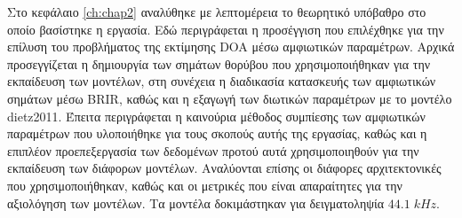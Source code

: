 
\noindent
Στο κεφάλαιο \ref{ch:chap2} αναλύθηκε με λεπτομέρεια το θεωρητικό υπόβαθρο στο οποίο βασίστηκε η εργασία. Εδώ περιγράφεται η προσέγγιση που επιλέχθηκε για την επίλυση του προβλήματος της εκτίμησης DOA μέσω αμφιωτικών παραμέτρων. Αρχικά προσεγγίζεται η δημιουργία των σημάτων θορύβου που χρησιμοποιήθηκαν για την εκπαίδευση των μοντέλων, στη συνέχεια η διαδικασία κατασκευής των αμφιωτικών σημάτων μέσω BRIR, καθώς και η εξαγωγή των διωτικών παραμέτρων με το μοντέλο dietz2011. Έπειτα περιγράφεται η καινούρια μέθοδος συμπίεσης των αμφιωτικών παραμέτρων που υλοποιήθηκε για τους σκοπούς αυτής της εργασίας, καθώς και η επιπλέον προεπεξεργασία των δεδομένων προτού αυτά χρησιμοποιηθούν για την εκπαίδευση των διάφορων μοντέλων. Αναλύονται επίσης οι διάφορες αρχιτεκτονικές που χρησιμοποιήθηκαν, καθώς και οι μετρικές που είναι απαραίτητες για την αξιολόγηση των μοντέλων. Τα μοντέλα δοκιμάστηκαν για δειγματοληψία $44.1\; kHz$.











